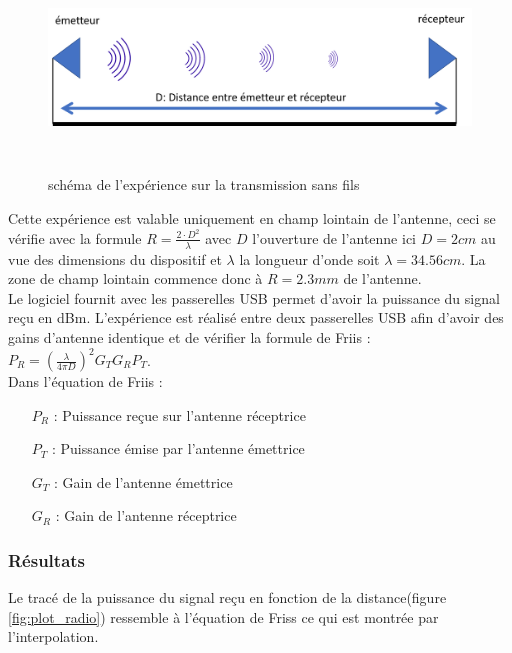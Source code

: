 \documentclass{rapportENS}
\begin{document}
\begin{figure}[h!]
    \centering
    \includegraphics[width=\linewidth,height=5.5cm]{exp_resseaux.png}
    \vspace{0.5cm}
    \caption{schéma de l'expérience sur la transmission sans fils}
    \vspace{0.5cm}
    \label{fig:exp_sans_fils}
\end{figure}

Cette expérience est valable uniquement en champ lointain de l'antenne, ceci se vérifie avec la formule $ R=\frac{2\cdot D^2}{\lambda}$ avec $D$ l'ouverture de l'antenne ici $D=2cm$ au vue des dimensions du dispositif et $\lambda$ la longueur d'onde soit $\lambda=34.56cm$. La zone de champ lointain commence donc à $R = 2.3mm$ de l'antenne.
\vspace{0.3cm}\\
Le logiciel fournit avec les passerelles USB permet d'avoir la puissance du signal reçu en dBm. L'expérience est réalisé entre deux passerelles USB afin d'avoir des gains d'antenne identique et de vérifier la formule de Friis : $P_R=(\frac{\lambda}{4\pi D})^2 G_T G_R P_T $.
\vspace{0.2cm}\\
Dans l'équation de Friis : 
\vspace{0.2cm}
\begin{itemize}
    \item[$P_R$] : Puissance reçue sur l'antenne réceptrice
    \item[$P_T$] : Puissance émise par l'antenne émettrice
    \item[$G_T$] : Gain de l'antenne émettrice
    \item[$G_R$] : Gain de l'antenne réceptrice
\end{itemize}
\subsubsection{Résultats}
Le tracé de la puissance du signal reçu en fonction de la distance(figure \ref{fig:plot_radio}) ressemble à l'équation de Friss ce qui est montrée par l'interpolation.
\end{document}
